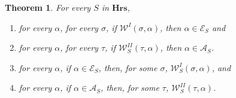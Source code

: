 \documentclass[a4paper]{amsart}
\theoremstyle{plain}
\newtheorem{theorem}{Theorem}
\begin{document}
 \begin{theorem}\label{T:strategies} For every $S$ in $\mathbf{Hrs}$,  \begin{enumerate}[\upshape (i)] \item for every $\alpha$,  for every $\sigma$, if $\mathcal{W}^I(\sigma, \alpha)$, then $\alpha \in \mathcal{E}_S$ and \item for every $\alpha$, for every $\tau$,  if $\mathcal{W}^{II}_S(\tau, \alpha)$, then $\alpha \in \mathcal{A}_S$. \item  for every $\alpha$,  if $ \alpha \in \mathcal{E}_S$, then, for some $\sigma$, $\mathcal{W}^I_{S}(\sigma, \alpha)$,  and \item for every $\alpha$,  if $ \alpha \in \mathcal{A}_S$, then, for some $\tau$,  $\mathcal{W}^{II}_S(\tau, \alpha)$.\end{enumerate} \end{theorem}
\end{document}
